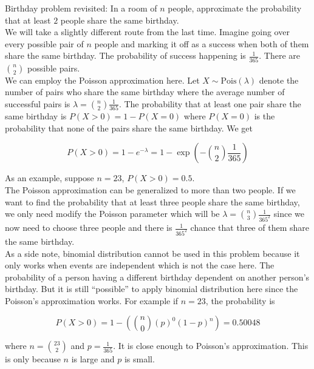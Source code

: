 \documentclass[12pt, a4paper]{article}
\newcounter{exa}
\begin{document}
\begin{texample}
Birthday problem revisited: In a room of $n$ people, approximate the probability that at least $2$ people share the same birthday. \\

We will take a slightly different route from the last time. Imagine going over every possible pair of $n$ people and marking it off as a success when both of them share the same birthday. The probability of success happening is $\frac{1}{365}$. There are ${n \choose 2}$ possible pairs. \\

We can employ the Poisson approximation here. Let $X\sim\text{Pois}(\lambda)$ denote the number of pairs who share the same birthday where the average number of successful pairs is $\lambda={n \choose 2}\frac{1}{365}$. The probability that at least one pair share the same birthday is $P(X>0)=1-P(X=0)$ where $P(X=0)$ is the probability that none of the pairs share the same birthday. We get

$$P(X>0)=1-e^{-\lambda}=1-\exp\left( -{n \choose 2}\frac{1}{365} \right)$$

As an example, suppose $n=23$, $P(X>0)=0.5$. \\

The Poisson approximation can be generalized to more than two people. If we want to find the probability that at least three people share the same birthday, we only need modify the Poisson parameter which will be $\lambda={n \choose 3}\frac{1}{365^2}$ since we now need to choose three people and there is $\frac{1}{365^2}$ chance that three of them share the same birthday. \\

As a side note, binomial distribution cannot be used in this problem because it only works when events are independent which is not the case here. The probability of a person having a different birthday dependent on another person's birthday. But it is still ``possible'' to apply binomial distribution here since the Poisson's approximation works. For example if $n=23$, the probability is

$$P(X>0)=1-\left({n \choose 0} \left( p \right)^0 \left( 1-p \right)^{n}\right)=0.50048$$

where $n={23 \choose 2}$ and $p=\frac{1}{365}$. It is close enough to Poisson's approximation. This is only because $n$ is large and $p$ is small.
\end{texample}
\end{document}
